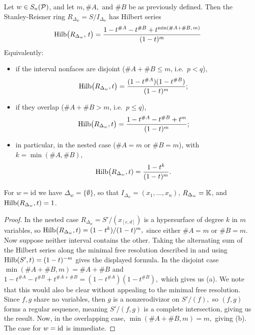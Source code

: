 \begin{theorem}
\label{thm: hilbert series - single Schubert variety}
Let $w \in S_n(\mathcal{P})$, and let $m, \#A,$ and $\#B$ be as previously defined. Then the Stanley-Reisner ring $R_{\Delta_w} = S/I_{\Delta_w}$ has Hilbert series
\[
  \mathrm{Hilb}\big(R_{\Delta_w},\, t\big)
  = \frac{1 - t^{\#A} - t^{\#B} + t^{\min(\#A + \#B,\, m)}}{(1-t)^{m}}
\]
Equivalently:
\begin{itemize}
\item if the interval nonfaces are disjoint \textup{(}$\#A + \#B \leq m$, i.e.\ $p < q$\textup{)},
\[
  \mathrm{Hilb}\big(R_{\Delta_w},t\big) = \frac{(1-t^{\#A})(1-t^{\#B})}{(1-t)^{m}};
\]
\item if they overlap \textup{(}$\#A + \#B > m$, i.e.\ $p \leq q$\textup{)},
\[
  \mathrm{Hilb}\big(R_{\Delta_w},t\big) = \frac{1 - t^{\#A} - t^{\#B} + t^{m}}{(1-t)^{m}};
\]
\item in particular, in the nested case ($\#A = m$ or $\#B = m$), with $k = \min(\#A,\#B),$
\[
\mathrm{Hilb}\big(R_{\Delta_w},t) = \frac{1 - t^k}{(1-t)^m}.
\]
\end{itemize}
For $w = \mathrm{id}$ we have $\Delta_w = \{\emptyset\}$, so that
$I_{\Delta_w} = (x_1,\dots,x_n)$, $R_{\Delta_w} = \mathbb{K}$, and
$\mathrm{Hilb}(R_{\Delta_w},t) = 1$.
\end{theorem}

\begin{proof}
    In the nested case $R_{\Delta_w} = S'/(x_{[c,d]})$ is a hypersurface of degree $k$ in $m$ variables, so $\mathrm{Hilb}\big(R_{\Delta_w},t) = (1 - t^k)/(1-t)^m,$ since either $\#A = m $ or $\#B = m.$
    Now suppose neither interval contains the other.
    Taking the alternating sum of the Hilbert series along the minimal free resolution described in  and using $\mathrm{Hilb}(S',t) = (1-t)^{-m}$ gives the displayed formula. In the disjoint case $\min(\#A + \#B,m) = \#A + \#B$ and $1 - t^{\#A} - t^{\#B} + t^{\#A + \#B} = (1-t^{\#A})(1-t^{\#B}),$ which gives us (a). 
    We note that this would also be clear without appealing to the minimal free resolution. 
    Since $f,g$ share no variables, then $g$ is a nonzerodivizor on $S'/(f),$ so $(f,g)$ forms a regular sequence, meaning $S'/(f,g)$ is a complete intersection, giving us the result.
    Now, in the overlapping case, $\min(\#A + \#B, m) = m,$ giving (b). The case for $w = \mathrm{id}$ is immediate.
\end{proof}

